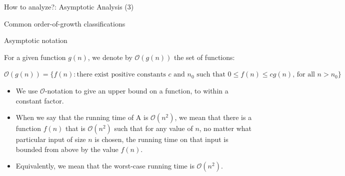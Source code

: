\documentclass[aspectratio=169, xcolor=dvipsnames]{beamer}
\begin{document}
\begin{frame}{How to analyze?: Asymptotic Analysis (3)}
    \begin{block}{Common order-of-growth classifications}
    \end{block}
\end{frame}

\begin{frame}{Asymptotic notation}
    \begin{block}{}
        For a given function $g(n)$, we denote by $\mathcal{O}(g(n))$ the set of functions:
        \begin{center}
        $\mathcal{O}(g(n)) = \{ f(n) : \text{there exist positive constants } c \text{ and } n_0 \text{ such that } 0 \le f(n) \le cg(n) \text{, for all } n > n_0 \}$
        \end{center}
        \begin{itemize}[<+->]
            \item We use $\mathcal{O}$-notation to give an upper bound on a function, to within a constant factor.
            \item When we say that the running time of A is $\mathcal{O}(n^2)$, we mean that there is a function $f(n)$ that is $\mathcal{O}(n^2)$ such that for any value of $n$, no matter what particular input of size $n$ is chosen, the running time on that input is bounded from above by the value $f(n)$.
            \item Equivalently, we mean that the worst-case running time is $\mathcal{O}(n^2)$.
        \end{itemize}
    \end{block}
\end{frame}
\end{document}

